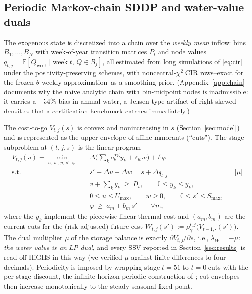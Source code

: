 \documentclass[pdflatex,sn-mathphys-num]{sn-jnl}
\theoremstyle{thmstyleone}
\theoremstyle{thmstyletwo}
\theoremstyle{thmstylethree}
\newcommand{\E}{\mathbb{E}}
\newcommand{\ssv}{\lambda_{W}}
\begin{document}
\subsection{Periodic Markov-chain SDDP and water-value duals}
\label{sec:algo}

The exogenous state is discretized into a chain over the \emph{weekly
mean} inflow: bins $B_1,\dots,B_N$ with week-of-year transition matrices
$P_t$ and node values $q_{t,j} = \E[\bar Q_{\text{week}} \mid \text{week } t,\,
\bar Q \in B_j]$, all estimated from long simulations of
\eqref{eq:cir} under the positivity-preserving schemes, with noncentral-$\chi^2$ CIR rows--exact for the frozen-$\theta$ weekly approximation--as a smoothing prior. (Appendix~\ref{app:chain}
documents why the naive analytic chain with bin-midpoint nodes is
inadmissible: it carries a $+34\%$ bias in annual water, a Jensen-type
artifact of right-skewed densities that a certification benchmark
catches immediately.)

The cost-to-go $V_{t,j}(s)$ is convex and nonincreasing in $s$
(Section~\ref{sec:model}) and is represented as the upper envelope of
affine minorants (``cuts''). The stage subproblem at $(t,j,s)$ is the
linear program
\begin{equation}
\begin{aligned}
V_{t,j}(s) = \min_{u,\,w,\,y,\,s',\,\varphi}\quad
& \Delta\Big(\textstyle\sum_{k} c^{\mathrm{seg}}_k y_k + \varepsilon_w w\Big)
 + \delta\,\varphi \\
\text{s.t.}\quad
& s' + \Delta u + \Delta w = s + \Delta q_{t,j}
&& \big[\mu\big] \\
& u + \textstyle\sum_k y_k \ \ge\ D_t, \qquad
0 \le y_k \le \bar y_k,\\
& 0 \le u \le U_{\max}, \qquad w \ge 0, \qquad
0 \le s' \le S_{\max},\\
& \varphi \ \ge\ a_m + b_m\, s' \qquad \forall m,
\end{aligned}
\label{eq:stageLP}
\end{equation}
where the $y_k$ implement the piecewise-linear thermal cost and
$(a_m,b_m)$ are the current cuts for the (risk-adjusted) future cost
$W_{t,j}(s') := \rho^{t,j}_\gamma\big(V_{t+1,\cdot}(s')\big)$. The dual
multiplier $\mu$ of the storage balance is exactly
$\partial V_{t,j}/\partial s$, i.e., $\ssv = -\mu$: \emph{the water value
is an LP dual}, and every SSV reported in Section~\ref{sec:results} is
read off HiGHS in this way (we verified $\mu$ against finite differences
to four decimals). Periodicity is imposed by wrapping stage $t=51$ to
$t=0$ cuts with the per-stage discount, the infinite-horizon periodic
construction of \citet{shapiro2020}; cut envelopes then increase
monotonically to the steady-seasonal fixed point.
\end{document}
